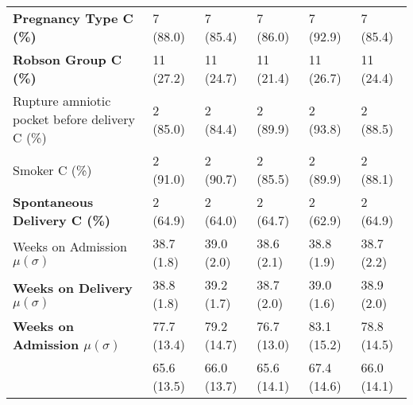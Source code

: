 \begin{tabular}{llllll}
   \textbf{Pregnancy Type C (\%)} & 7 (88.0) & 7 (85.4) & 7 (86.0) & 7 (92.9) & 7 (85.4) \\
   \textbf{Robson Group C (\%)}& 11 (27.2) & 11 (24.7) & 11 (21.4) & 11 (26.7) & 11 (24.4) \\
   \begin{minipage}{3.7cm}\setstretch{0.65}Rupture amniotic pocket before delivery C (\%)\vspace{1mm}\end{minipage} & 2 (85.0) & 2 (84.4) & 2 (89.9) & 2 (93.8) & 2 (88.5) \\
   Smoker C (\%) & 2 (91.0) & 2 (90.7) & 2 (85.5) & 2 (89.9) & 2 (88.1) \\
   \textbf{Spontaneous Delivery C (\%)} & 2 (64.9) & 2 (64.0) & 2 (64.7) & 2 (62.9) & 2 (64.9) \\
   Weeks on Admission $\mu (\sigma)$ & 38.7 (1.8) & 39.0 (2.0) & 38.6 (2.1) & 38.8 (1.9) & 38.7 (2.2) \\
   \textbf{Weeks on Delivery $\mu (\sigma)$ }  & 38.8 (1.8) & 39.2 (1.7) & 38.7 (2.0) & 39.0 (1.6) & 38.9 (2.0) \\
   \textbf{Weeks on Admission $\mu (\sigma)$ } & 77.7 (13.4) & 79.2 (14.7) & 76.7 (13.0) & 83.1 (15.2) & 78.8 (14.5) \\
   \textbf{\begin{minipage}{3.3cm}\setstretch{0.65}Weight start of pregnancy $\mu (\sigma)$ \vspace{1mm}\end{minipage}}  & 65.6 (13.5) & 66.0 (13.7) & 65.6 (14.1) & 67.4 (14.6) & 66.0 (14.1) \\
   
   
   
   \bottomrule
   \end{tabular}
   